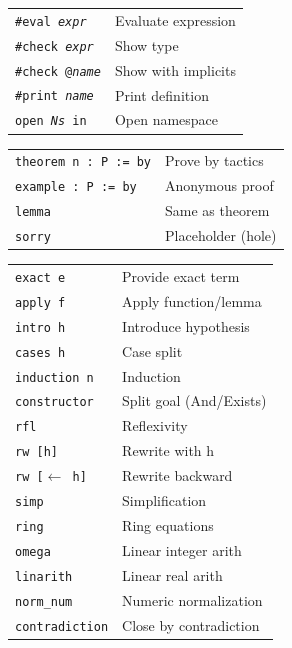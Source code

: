\documentclass[10pt]{extarticle}
\begin{document}
\begin{multicols}{2}
\begin{tabularx}{\linewidth}{@{}l@{\enspace}Y@{}}
\texttt{\#eval \textit{expr}}     & Evaluate expression \\
\texttt{\#check \textit{expr}}    & Show type \\
\texttt{\#check @\textit{name}}   & Show with implicits \\
\texttt{\#print \textit{name}}    & Print definition \\
\texttt{open \textit{Ns} in}      & Open namespace \\
\end{tabularx}

\begin{tabularx}{\linewidth}{@{}l@{\enspace}Y@{}}
\texttt{theorem n : P := by}      & Prove by tactics \\
\texttt{example : P := by}        & Anonymous proof \\
\texttt{lemma}                    & Same as theorem \\
\texttt{sorry}                    & Placeholder (hole) \\
\end{tabularx}

\begin{tabularx}{\linewidth}{@{}l@{\enspace}Y@{}}
\texttt{exact e}           & Provide exact term \\
\texttt{apply f}           & Apply function/lemma \\
\texttt{intro h}           & Introduce hypothesis \\
\texttt{cases h}           & Case split \\
\texttt{induction n}       & Induction \\
\texttt{constructor}       & Split goal (And/Exists) \\
\texttt{rfl}               & Reflexivity \\
\texttt{rw [h]}            & Rewrite with h \\
\texttt{rw [$\leftarrow$ h]} & Rewrite backward \\
\texttt{simp}              & Simplification \\
\texttt{ring}              & Ring equations \\
\texttt{omega}             & Linear integer arith \\
\texttt{linarith}          & Linear real arith \\
\texttt{norm\_num}         & Numeric normalization \\
\texttt{contradiction}     & Close by contradiction \\
\end{tabularx}


\end{multicols}
\end{document}

